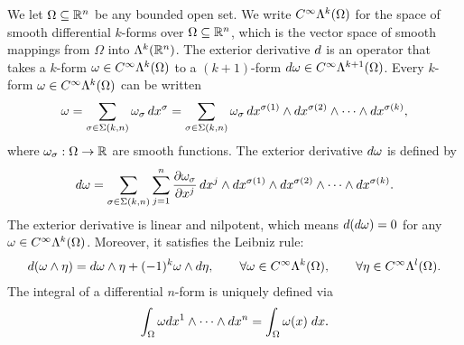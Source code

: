 \documentclass[10pt,a4paper]{article}
\begin{document}
We let $\Omega \subseteq {\mathbb R}^{n}$ be any bounded open set.
We write $C^{\infty}\Lambda^{k}(\Omega)$ for the space of smooth differential $k$-forms over $\Omega \subseteq {\mathbb R}^{n}$,
which is the vector space of smooth mappings from $\Omega$ into $\Lambda^{k}({\mathbb R}^{n})$.
The exterior derivative \( d \) is an operator that takes a \( k \)-form \( \omega \in C^{\infty}\Lambda^{k}(\Omega) \) 
to a \((k+1)\)-form \( d\omega \in C^{\infty}\Lambda^{k+1}(\Omega) \). 
Every \( k \)-form \( \omega \in C^{\infty}\Lambda^{k}(\Omega) \) can be written 
\begin{gather}\label{math:canonicalrepresentation}
    \omega 
    = 
    \sum_{ \sigma \in \Sigma(k,n) } 
    \omega_{\sigma} \, 
    dx^{\sigma}
    = 
    \sum_{ \sigma \in \Sigma(k,n) } 
    \omega_{\sigma} \, 
    dx^{\sigma(1)} \wedge dx^{\sigma(2)} \wedge \cdots \wedge dx^{\sigma(k)},
\end{gather}
where \( \omega_{\sigma} : \Omega \rightarrow {\mathbb R} \) are smooth functions.
The exterior derivative \( d\omega \) is defined by
\begin{gather*}
    d\omega = 
    \sum_{ \sigma \in \Sigma(k,n) } 
    \sum_{j=1}^{n} 
    \frac{\partial \omega_{\sigma}}{\partial x^j} 
    \, dx^j \wedge 
    dx^{\sigma(1)} \wedge dx^{\sigma(2)} \wedge \cdots \wedge dx^{\sigma(k)}.
\end{gather*}
The exterior derivative is linear and nilpotent, which means 
\( d(d\omega) = 0 \) for any \( \omega \in C^{\infty}\Lambda^{k}(\Omega) \).
Moreover, it satisfies the Leibniz rule:
\begin{gather*} 
    d(\omega \wedge \eta) 
    = 
    d\omega \wedge \eta + (-1)^{k} \omega \wedge d\eta, 
    \qquad \forall \omega \in C^{\infty}\Lambda^{k}(\Omega), 
    \qquad \forall \eta \in C^{\infty}\Lambda^{l}(\Omega).
\end{gather*}
The integral of a differential $n$-form is uniquely defined via 
\begin{gather*}
    \int_{\Omega} \omega dx^{1} \wedge \dots \wedge dx^{n} = \int_{\Omega} \omega(x) \;dx
    . 
\end{gather*}
\end{document}
